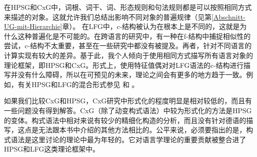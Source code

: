 在HPSG和CxG中，词根、词干、词、形态规则和句法规则都是可以按照相同方式来描述的对象。这就允许我们总结出影响不同对象的普遍规律（见第\ref{Abschnitt-UG-mit-Hierarchie}章）。
在LFG中，c-结构被认为在根本上是不同的，这就是为什么这种普遍化是不可能的。在跨语言的研究中，有一种在f-结构中捕捉相似性的尝试，c-结构不太重要，甚至在一些研究中都没有被提及。再者，针对不同语言的计算实现有较大的差异。基于此，我个人倾向于使用相同方式描写所有语言对象的理论框架，即HPSG和CxG。形式上，使用特征值偶对对LFG语法的c-结构进行描写并没有什么障碍，所以在可预见的未来，理论之间会有更多的地方趋于一致。例如，有关HPSG和LFG的混合形式参见 和 。

如果我们比较CxG和HPSG，CxG研究中形式化的程度明显是相对较低的，而且有一些问题没有得到解答。CxG（除了动变构式语法）中较为形式化的方法是HPSG的变体。构式语法中相对来说有较少的精细化构造的分析，而且没有针对德语的描写，这点是无法跟本书中介绍的其他方法相比的。公平来说，必须要指出的是，构式语法是这里讨论的理论中最为年轻的。它对语言学理论的重要贡献被整合进了HPSG和LFG这类理论框架中。

